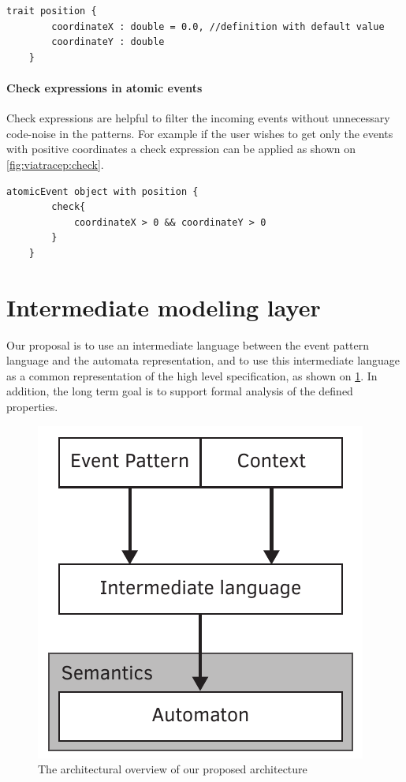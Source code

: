 \begin{lstlisting}[caption={Example of the traits in VIATRA-CEP},label={fig:viatracep:trait}]
	trait position {
		coordinateX : double = 0.0, //definition with default value
		coordinateY : double
	}
\end{lstlisting}


\paragraph{Check expressions in atomic events}

Check expressions are helpful to filter the incoming events without unnecessary code-noise in the patterns. For example if the user wishes to get only the events with positive coordinates a check expression can be applied as shown on \cref{fig:viatracep:check}.

\begin{lstlisting}[caption={Example of the Check expression in VIATRA-CEP},label={fig:viatracep:check}]
	atomicEvent object with position {
		check{
			coordinateX > 0 && coordinateY > 0
		}
	}
\end{lstlisting}



\section{Intermediate modeling layer}
Our proposal is to use an intermediate language between the event pattern language and the automata representation, and to use this intermediate language as a common representation of the high level specification, as shown on \cref{fig:viatracep:newcep}. In addition, the long term goal is to support formal analysis of the defined properties. 


\begin{figure}[h]
	\centering
	\includegraphics[width=0.4\linewidth]{figures/chapter_3/newcep}
	\caption{The architectural overview of our proposed architecture \redraw}
	\label{fig:viatracep:newcep}
\end{figure}


